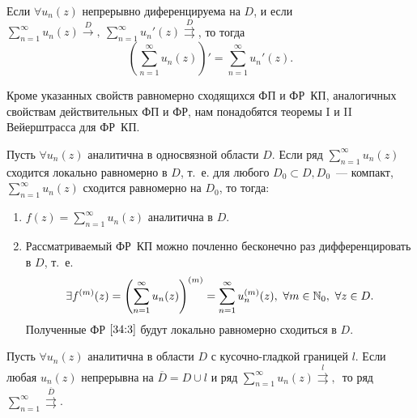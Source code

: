 \documentclass[../../main.tex]{subfiles}
\begin{document}
\begin{thm}[о дифференцировании ФР~КП]
Если $ \forall u_n(z) $ непрерывно диференцируема на $ D $, и если $ 
\sum\limits_{n = 1}^{\infty} u_n(z) \overset{D}{\longrightarrow},\  
\sum\limits_{n = 1}^{\infty} u_n'(z) \overset{D}\rightrightarrows $, то 
тогда
\[\left(\sum\limits_{n = 1}^{\infty} u_n(z)\right)' = \sum\limits_{n = 
1}^{\infty} 
u_n'(z).\]
\end{thm}

Кроме указанных свойств равномерно сходящихся ФП и ФР~КП, аналогичных 
свойствам 
действительных ФП и ФР, нам понадобятся теоремы I и II Вейерштрасса для ФР~КП.

\begin{thm}
	Пусть $ \forall u_n(z) $ аналитична в односвязной области $ D $. Если ряд $ 
	\sum\limits_{n = 1}^{\infty} u_n(z) $ сходится локально равномерно в $ D $, 
	т.~е. для любого $ {D_0 \subset D}, D_0 $~--- компакт, $ \sum\limits_{n = 
	1}^{\infty} u_n(z) $ сходится равномерно на $ D_0 $, то тогда:
	\begin{enumerate}
		\item  $ f(z) = \sum\limits_{n = 1}^{\infty} u_n(z) $ аналитична в 
		$ D $.
		\item Рассматриваемый ФР~КП можно почленно бесконечно раз дифференцировать в 
		$ D $, т.~е.
		\begin{equation}\label{34:3}
			 \exists f^{(m)}(z) = \left(\sum\limits_{n = 1}^{\infty} 
			 u_n(z)\right)^{(m)} = 
			 \sum\limits_{n = 1}^{\infty} u_n^{(m)} (z), \ \forall m \in \N_0,\ 
			 \forall z \in D.
		\end{equation}
		Полученные ФР $ \eqref{34:3} $ будут локально равномерно сходиться в $ D $.
	\end{enumerate}
\end{thm}

\begin{thm}
	Пусть $ \forall u_n(z) $ аналитична в области $ D $ с кусочно-гладкой 
	границей $ l $. Если любая $ u_n(z) $ непрерывна на $ \overline{D} = D \cup 
	l $ и ряд $ \sum\limits_{n = 1}^{\infty} u_n(z) 
	\overset{l}\rightrightarrows,\, $ то ряд $ \sum\limits_{n = 1}^{\infty} 
	\overset{\overline{D}}\rightrightarrows $.
\end{thm}
\end{document}
